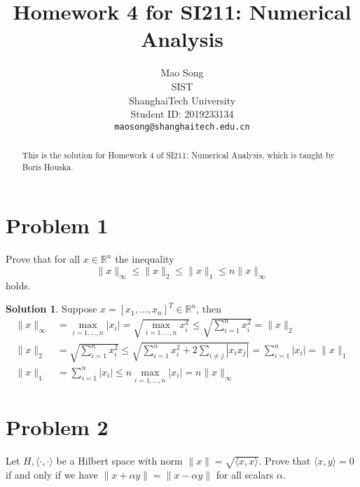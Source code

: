 \documentclass{article}
\title{Homework 4 for SI211: Numerical Analysis}
\author{%
  {Mao Song} \\
  SIST\\
  ShanghaiTech University\\
  Student ID: 2019233134 \\
  \texttt{maosong@shanghaitech.edu.cn} \\
}
\theoremstyle{definition}
\newtheorem{solution}{Solution}
\begin{document}
\maketitle

\begin{abstract}
  This is the solution for Homework 4 of SI211: Numerical Analysis, which is taught by Boris Houska.
\end{abstract}

\section{Problem 1}
Prove that for all $x\in\mathbb{R}^n$ the inequality 
\begin{equation}
  \|x\|_\infty \leq \|x\|_2\leq \|x\|_1\leq n\|x\|_\infty
\end{equation}
holds.

\begin{solution}
  Suppose $x=[x_1,\dots,x_n]^T\in\mathbb{R}^n$, then
  \begin{align*}
  \|x\|_\infty&=\max_{i=1,\dots,n}|x_i|=\sqrt{\max_{i=1,\dots,n}x_i^2}\leq \sqrt{\sum_{i=1}^{n}x_i^2}=\|x\|_2\\
  \|x\|_2&=\sqrt{\sum_{i=1}^{n}x_i^2}\leq \sqrt{\sum_{i=1}^{n}x_i^2+2\sum_{i\neq j}|x_ix_j|}=\sum_{i=1}^{n}|x_i|=\|x\|_1\\
  \|x\|_1&=\sum_{i=1}^{n}|x_i|\leq n\max_{i=1,\dots,n}|x_i|=n\|x\|_\infty
  \end{align*}
\end{solution}

  


\section{Problem 2}
Let $H, \langle \cdot,\cdot\rangle$ be a Hilbert space with norm $\|x\|=\sqrt{\langle x,x\rangle}$. Prove that $\langle x,y\rangle=0$ if and only if we have $\|x+\alpha y\|=\|x-\alpha y\|$ for all scalars $\alpha$.
\end{document}
